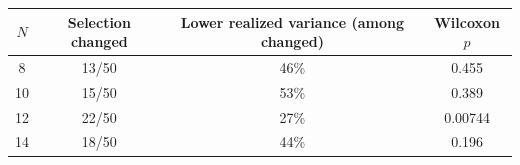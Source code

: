 \begin{tabular}{cccc}
\toprule
$N$ & Selection changed & Lower realized variance (among changed) & Wilcoxon $p$ \\
\midrule
8 & 13/50 & 46\% & 0.455 \\
10 & 15/50 & 53\% & 0.389 \\
12 & 22/50 & 27\% & 0.00744 \\
14 & 18/50 & 44\% & 0.196 \\
\bottomrule
\end{tabular}
